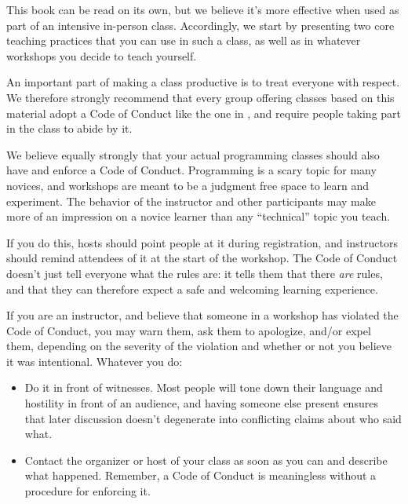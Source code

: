 
This book can be read on its own, but we believe it's more effective
when used as part of an intensive in-person class.  Accordingly, we
start by presenting two core teaching practices that you can use in
such a class, as well as in whatever workshops you decide to teach
yourself.


An important part of making a class productive is to treat everyone
with respect.  We therefore strongly recommend that every group
offering classes based on this material adopt a Code of Conduct like
the one in , and require people taking part in the
class to abide by it.

We believe equally strongly that your actual programming classes
should also have and enforce a Code of Conduct.  Programming is a
scary topic for many novices, and workshops are meant to be a judgment
free space to learn and experiment. The behavior of the instructor and
other participants may make more of an impression on a novice learner
than any ``technical'' topic you teach.

If you do this, hosts should point people at it during registration,
and instructors should remind attendees of it at the start of the
workshop. The Code of Conduct doesn't just tell everyone what the
rules are: it tells them that there \emph{are} rules, and that they
can therefore expect a safe and welcoming learning experience.

If you are an instructor, and believe that someone in a workshop has
violated the Code of Conduct, you may warn them, ask them to
apologize, and/or expel them, depending on the severity of the
violation and whether or not you believe it was intentional.  Whatever
you do:

\begin{itemize}

\item
  Do it in front of witnesses.  Most people will tone down their
  language and hostility in front of an audience, and having someone
  else present ensures that later discussion doesn't degenerate into
  conflicting claims about who said what.

\item
  Contact the organizer or host of your class as soon as you can and
  describe what happened.  Remember, a Code of Conduct is meaningless
  without a procedure for enforcing it.

\end{itemize}

